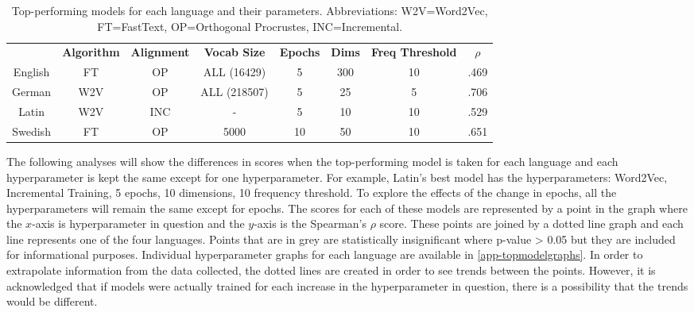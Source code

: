 \begin{table}[h]
\centering
\begin{tabular}{cccccccc} 
\toprule
\textbf{ } & \textbf{ Algorithm } & \textbf{ Alignment } & \textbf{ Vocab Size } & \textbf{ Epochs } & \textbf{ Dims } & \textbf{ Freq Threshold } & \textbf{ $\rho$ }  \\
English    & FT              & OP               & ALL (16429)      & 5                 & 300             & 10               & .469            \\
German     & W2V             & OP               & ALL (218507)     & 5                 & 25              & 5                & .706            \\
Latin      & W2V             & INC              & -                & 5                 & 10              & 10               & .529            \\
Swedish    & FT              & OP               & 5000             & 10                & 50              & 10               & .651            \\
\bottomrule
\end{tabular}
\caption{Top-performing models for each language and their parameters. Abbreviations: W2V=Word2Vec, FT=FastText, OP=Orthogonal Procrustes, INC=Incremental.}
\label{tab:top-models}
\end{table}

The following analyses will show the differences in scores when the top-performing model is taken for each language and each hyperparameter is kept the same except for one hyperparameter. For example, Latin’s best model has the hyperparameters: Word2Vec, Incremental Training, 5 epochs, 10 dimensions, 10 frequency threshold. To explore the effects of the change in epochs, all the hyperparameters will remain the same except for epochs. The scores for each of these models are represented by a point in the graph where the $x$-axis is hyperparameter in question and the $y$-axis is  the Spearman's $\rho$ score. These points are joined by a dotted line graph and each line represents one of the four languages. Points that are in grey are statistically insignificant where p-value > 0.05 but they are included  for informational purposes. Individual hyperparameter graphs for each language are available in \autoref{app-topmodelgraphs}. In order to extrapolate information from the data collected, the dotted lines are created in order to see trends between the points. However, it is acknowledged that if models were actually trained for each increase in the hyperparameter in question, there is a possibility that the trends would be different. 

